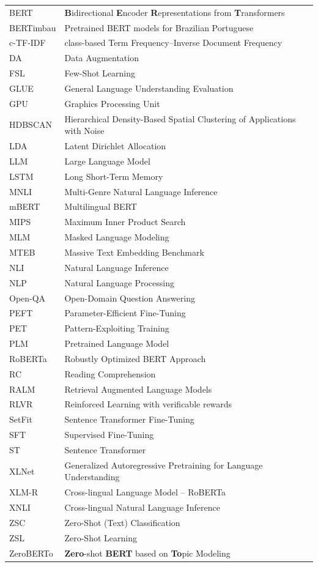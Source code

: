\documentclass[]{politex-xico}
\begin{document}
\begin{table}[h]
\begin{tabular}{  l  l } 
BERT  &  \textbf{B}idirectional \textbf{E}ncoder \textbf{R}epresentations from \textbf{T}ransformers\\
BERTimbau & Pretrained BERT models for Brazilian Portuguese\\
c-TF-IDF & class-based Term Frequency–Inverse Document Frequency\\
DA & Data Augmentation\\
FSL & Few-Shot Learning\\
GLUE & General Language Understanding Evaluation\\
GPU & Graphics Processing Unit\\
HDBSCAN & Hierarchical Density-Based Spatial Clustering of Applications with Noise\\
LDA & Latent Dirichlet Allocation\\
LLM & Large Language Model\\
LSTM & Long Short-Term Memory\\
MNLI & Multi-Genre Natural Language Inference\\
mBERT & Multilingual BERT\\
MIPS & Maximum Inner Product Search\\
MLM & Masked Language Modeling\\
MTEB & Massive Text Embedding Benchmark\\
NLI   & Natural Language Inference\\
NLP   & Natural Language Processing\\
Open-QA   & Open-Domain Question Answering\\
PEFT & Parameter-Efficient Fine-Tuning\\
PET & Pattern-Exploiting Training\\
PLM & Pretrained Language Model\\
RoBERTa   & Robustly Optimized BERT Approach\\
RC & Reading Comprehension\\
RALM & Retrieval Augmented Language Models\\
RLVR & Reinforced Learning with verificable rewards\\
SetFit & Sentence Transformer Fine-Tuning\\
SFT & Supervised Fine-Tuning\\
ST & Sentence Transformer\\
XLNet   & Generalized Autoregressive Pretraining for Language Understanding\\
XLM-R & Cross-lingual Language Model – RoBERTa\\
XNLI & Cross-lingual Natural Language Inference\\
ZSC & Zero-Shot (Text) Classification\\
ZSL & Zero-Shot Learning\\
ZeroBERTo & \textbf{Zero}-shot \textbf{BERT} based on \textbf{To}pic Modeling\\
\end{tabular}
\end{table}
\end{document}
